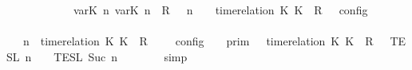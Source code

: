 \begin{isabellebody}
\ \ \ \ \ \ \ \ \ \ {\isacharequal}\ {\isasymlbrakk}\ {\isacharparenleft}{\isacharparenleft}{\isasymlfloor}{\isasymtau}\isactrlsub v\isactrlsub a\isactrlsub r{\isacharparenleft}K\ n{\isacharparenright}{\isacharcomma}\ {\isasymtau}\isactrlsub v\isactrlsub a\isactrlsub r{\isacharparenleft}K\ n{\isacharparenright}{\isasymrfloor}\ {\isasymin}\ R{\isacharparenright}\ {\isacharhash}\ {\isasymGamma}{\isacharparenright}{\isacharcomma}\ n\ {\isasymturnstile}\ {\isasymPsi}\ {\isasymtriangleright}\ {\isacharparenleft}{\isacharparenleft}time{\isacharminus}relation\ {\isasymlfloor}K\ K\ {\isasymin}\ R{\isacharparenright}\ {\isacharhash}\ {\isasymPhi}{\isacharparenright}\ {\isasymrbrakk}\isactrlsub c\isactrlsub o\isactrlsub n\isactrlsub f\isactrlsub i\isactrlsub g{\isacartoucheclose}\isanewline
%
\isadelimproof
\ \ %
\endisadelimproof
%
\isatagproof
{}\isamarkupfalse%
\ {\isacharminus}\isanewline
\ \ \ \ \isamarkupfalse%
\ {\isacartoucheopen}{\isasymlbrakk}\ {\isasymGamma}{\isacharcomma}\ n\ {\isasymturnstile}\ {\isacharparenleft}time{\isacharminus}relation\ {\isasymlfloor}K\ K\ {\isasymin}\ R{\isacharparenright}\ {\isacharhash}\ {\isasymPsi}\ {\isasymtriangleright}\ {\isasymPhi}\ {\isasymrbrakk}\isactrlsub c\isactrlsub o\isactrlsub n\isactrlsub f\isactrlsub i\isactrlsub g\ {\isacharequal}\ {\isasymlbrakk}{\isasymlbrakk}\ {\isasymGamma}\ {\isasymrbrakk}{\isasymrbrakk}\isactrlsub p\isactrlsub r\isactrlsub i\isactrlsub m\ {\isasyminter}\ {\isasymlbrakk}{\isasymlbrakk}\ {\isacharparenleft}time{\isacharminus}relation\ {\isasymlfloor}K\ K\ {\isasymin}\ R{\isacharparenright}\ {\isacharhash}\ {\isasymPsi}\ {\isasymrbrakk}{\isasymrbrakk}\isactrlsub T\isactrlsub E\isactrlsub S\isactrlsub L\isactrlbsup {\isasymge}\ n\isactrlesup \ {\isasyminter}\ {\isasymlbrakk}{\isasymlbrakk}\ {\isasymPhi}\ {\isasymrbrakk}{\isasymrbrakk}\isactrlsub T\isactrlsub E\isactrlsub S\isactrlsub L\isactrlbsup {\isasymge}\ Suc\ n\isactrlesup {\isacartoucheclose}\isanewline
\ \ \ \ \ \ \isamarkupfalse%
\ simp\isanewline
\ \ \ \ \isamarkupfalse%
\ \isamarkupfalse%

\end{isabellebody}
